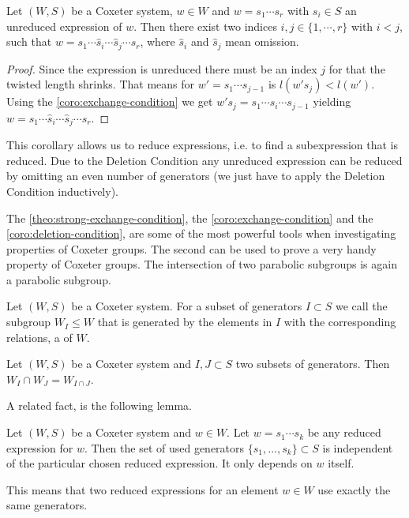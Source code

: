 \begin{coro}
	Let $(W,S)$ be a Coxeter system, $w \in W$ and $w = s_1 \cdots s_r$ with $s_i \in S$ an unreduced expression of $w$. Then there exist two indices $i,j \in \{1,\cdots,r\}$ with $i < j$, such that $w = s_1 \cdots \hat s_i \cdots \hat s_j \cdots s_r$, where $\hat s_i$ and $\hat s_j$ mean omission.

	\begin{proof}
		Since the expression is unreduced there must be an index $j$ for that the twisted length shrinks. That means for $w' = s_1 \cdots s_{j-1}$ is $l(w' s_j) < l(w')$. Using the \ref{coro:exchange-condition} we get $w' s_j = s_1 \cdots \hat s_i \cdots s_{j-1}$ yielding $w = s_1 \cdots \hat s_i \cdots \hat s_j \cdots s_r$.
	\end{proof}
\end{coro}

This corollary allows us to reduce expressions, i.e. to find a subexpression that is reduced. Due to the Deletion Condition any unreduced expression can be reduced by omitting an even number of generators (we just have to apply the Deletion Condition inductively).

The \ref{theo:strong-exchange-condition}, the \ref{coro:exchange-condition} and the \ref{coro:deletion-condition}, are some of the most powerful tools when investigating properties of Coxeter groups. The second can be used to prove a very handy property of Coxeter groups. The intersection of two parabolic subgroups is again a parabolic subgroup.

\begin{defi}
	Let $(W,S)$ be a Coxeter system. For a subset of generators $I \subset S$ we call the subgroup $W_I \leq W$ that is generated by the elements in $I$ with the corresponding relations, a  of $W$.
\end{defi}

\begin{lemm}
	Let $(W,S)$ be a Coxeter system and $I,J \subset S$ two subsets of generators. Then ${W_I \cap W_J} = W_{I \cap J}$.
\end{lemm}

A related fact, is the following lemma.

\begin{lemm}
	Let $(W,S)$ be a Coxeter system and $w \in W$. Let $w = s_1 \cdots s_k$ be any reduced expression for $w$. Then the set of used generators $\{s_1, \ldots, s_k\} \subset S$ is independent of the particular chosen reduced expression. It only depends on $w$ itself.
\end{lemm}

This means that two reduced expressions for an element $w \in W$ use exactly the same generators.
